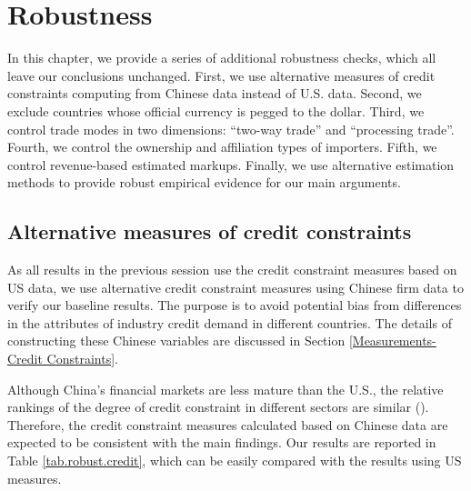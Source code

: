 \section{Robustness} \label{Robustness}

In this chapter, we provide a series of additional robustness checks, which all leave our conclusions unchanged. First, we use alternative measures of credit constraints computing from Chinese data instead of U.S. data. Second, we exclude countries whose official currency is pegged to the dollar. Third, we control trade modes in two dimensions: ``two-way trade'' and ``processing trade''. Fourth, we control the ownership and affiliation types of importers. Fifth, we control revenue-based estimated markups. Finally, we use alternative estimation methods to provide robust empirical evidence for our main arguments.

\subsection{Alternative measures of credit constraints}

As all results in the previous session use the credit constraint measures based on US data, we use alternative credit constraint measures using Chinese firm data to verify our baseline results. The purpose is to avoid potential bias from differences in the attributes of industry credit demand in different countries. The details of constructing these Chinese variables are discussed in Section \ref{Measurements-Credit Constraints}. 

Although China's financial markets are less mature than the U.S., the relative rankings of the degree of credit constraint in different sectors are similar (\cite{manova2013}). Therefore, the credit constraint measures calculated based on Chinese data are expected to be consistent with the main findings. Our results are reported in Table \ref{tab.robust.credit}, which can be easily compared with the results using US measures.

